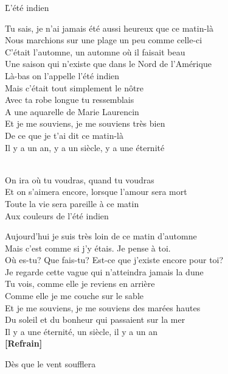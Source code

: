 \documentclass{novel}
\begin{document}
\newpage
\large

\h*{L’été indien}

Tu sais, je n'ai jamais été aussi heureux que ce matin-là \\
Nous marchions sur une plage un peu comme celle-ci \\
C'était l'automne, un automne où il faisait beau \\
Une saison qui n'existe que dans le Nord de l'Amérique \\
Là-bas on l'appelle l'été indien \\
Mais c'était tout simplement le nôtre \\
Avec ta robe longue tu ressemblais \\
A une aquarelle de Marie Laurencin \\
Et je me souviens, je me souviens très bien \\
De ce que je t'ai dit ce matin-là \\
Il y a un an, y a un siècle, y a une éternité \small \\

\large
\begin{bfseries}
[Refrain:]\\
On ira où tu voudras, quand tu voudras \\
Et on s'aimera encore, lorsque l'amour sera mort \\
Toute la vie sera pareille à ce matin \\
Aux couleurs de l'été indien \small \\
\end{bfseries}

\large
Aujourd'hui je suis très loin de ce matin d'automne \\
Mais c'est comme si j'y étais. Je pense à toi. \\
Où es-tu? Que fais-tu? Est-ce que j'existe encore pour toi? \\
Je regarde cette vague qui n'atteindra jamais la dune \\
Tu vois, comme elle je reviens en arrière \\
Comme elle je me couche sur le sable \\
Et je me souviens, je me souviens des marées hautes \\
Du soleil et du bonheur qui passaient sur la mer \\
Il y a une éternité, un siècle, il y a un an \\

\textbf{[Refrain]} 

\newpage
\small
\h*{Dès que le vent soufflera}
\end{document}

